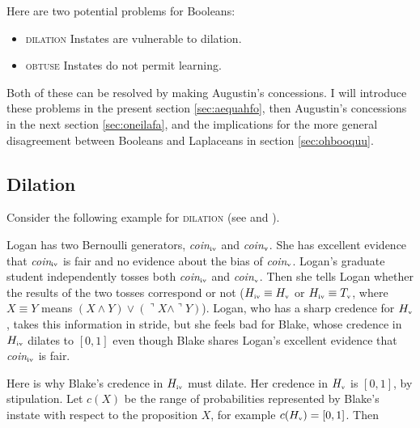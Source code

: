 \documentclass[phd,12pt,oneside]{ubcthesis}
\begin{document}
Here are two potential problems for Booleans:

\begin{itemize}
\item \textsc{dilation} Instates are vulnerable to dilation.
\item \textsc{obtuse} Instates do not permit learning.
\end{itemize}

{\noindent}Both of these can be resolved by making Augustin's concessions. I will
introduce these problems in the present section \ref{sec:aequahfo},
then Augustin's concessions in the next section \ref{sec:oneilafa},
and the implications for the more general disagreement between
Booleans and Laplaceans in section \ref{sec:ohbooquu}.

\subsection{Dilation}
\label{subsec:aejoorau}

Consider the following example for \textsc{dilation} (see
 and ).

\begin{quotex}
  \label{ex:dilation} Logan has two Bernoulli
  generators, \textit{coin}$_{\mbox{\tiny{iv}}}$ and
  \textit{coin}$_{\mbox{\tiny{v}}}$. She has excellent evidence that
  \textit{coin}$_{\mbox{\tiny{iv}}}$ is fair and no evidence about the
  bias of \textit{coin}$_{\mbox{\tiny{v}}}$. Logan's graduate student
  independently tosses both \textit{coin}$_{\mbox{\tiny{iv}}}$ and
  \textit{coin}$_{\mbox{\tiny{v}}}$. Then she tells Logan whether the
  results of the two tosses correspond or not
  ($H_{\mbox{\tiny{iv}}}\equiv{}H_{\mbox{\tiny{v}}}$ or
  $H_{\mbox{\tiny{iv}}}\equiv{}T_{\mbox{\tiny{v}}}$, where
  $X\equiv{}Y$ means
  $(X\wedge{}Y)\vee(\urcorner{}X\wedge\urcorner{}Y)$). Logan, who has
  a sharp credence for $H_{\mbox{\tiny{v}}}$, takes this information
  in stride, but she feels bad for Blake, whose credence in
  $H_{\mbox{\tiny{iv}}}$ dilates to $[0,1]$ even though Blake shares
  Logan's excellent evidence that \textit{coin}$_{\mbox{\tiny{iv}}}$
  is fair.
\end{quotex}

Here is why Blake's credence in $H_{\mbox{\tiny{iv}}}$ must dilate.
Her credence in $H_{\mbox{\tiny{v}}}$ is $[0,1]$, by stipulation. Let
$c(X)$ be the range of probabilities represented by Blake's instate
with respect to the proposition $X$, for example
$c(H_{\mbox{\tiny{v}}})=[0,1]$. Then
\end{document}
